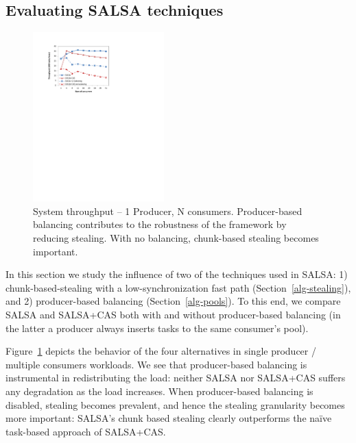 \subsection{Evaluating SALSA techniques}
\label{sec:eval-techniques}
\begin{figure}[htb]
	\includegraphics[width=0.45\textwidth]{figures/1-n-salsa}
  \caption{\footnotesize{System throughput -- 1 Producer, N consumers. Producer-based balancing contributes to the robustness of the framework by reducing stealing. With no balancing, chunk-based stealing becomes important. }}
	\vspace{-10pt}
	\label{fig:1-n-salsa}
\end{figure}
In this section we study the influence of two of the techniques used in SALSA: 1) chunk-based-stealing with a low-synchronization fast path (Section~\ref{alg-stealing}), and 2) producer-based balancing (Section~\ref{alg-pools}). 
To this end, we compare SALSA and SALSA+CAS both with and without producer-based balancing (in the latter a producer always inserts tasks to the same consumer's pool).

Figure~\ref{fig:1-n-salsa} depicts the behavior of the four alternatives in single producer / multiple consumers workloads. 
We see that producer-based balancing is instrumental in redistributing the load: neither SALSA nor SALSA+CAS suffers any degradation as the load increases. 
When producer-based balancing is disabled, stealing becomes prevalent, and hence the stealing granularity becomes more important: 
SALSA's chunk based stealing clearly outperforms the na\"{i}ve task-based approach of SALSA+CAS. 

